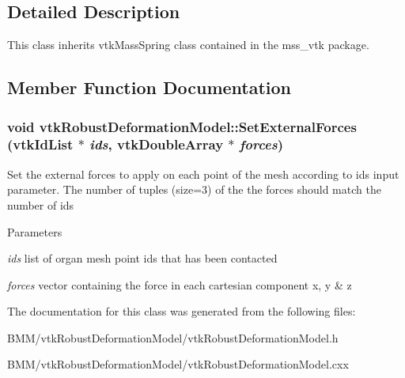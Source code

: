 \subsection{Detailed Description}
This class inherits vtkMassSpring class contained in the mss\_\-vtk package. 

\subsection{Member Function Documentation}
\hypertarget{classvtkRobustDeformationModel_aaa1d4245a3bcc536f145e2686f6135f6}{
\subsubsection[{SetExternalForces}]{\setlength{\rightskip}{0pt plus 5cm}void vtkRobustDeformationModel::SetExternalForces (vtkIdList $\ast$ {\em ids}, \/  vtkDoubleArray $\ast$ {\em forces})}}
\label{classvtkRobustDeformationModel_aaa1d4245a3bcc536f145e2686f6135f6}


Set the external forces to apply on each point of the mesh according to ids input parameter. The number of tuples (size=3) of the the forces should match the number of ids 
\begin{DoxyParams}{Parameters}
\item[{\em ids}]list of organ mesh point ids that has been contacted \item[{\em forces}]vector containing the force in each cartesian component x, y \& z \end{DoxyParams}


The documentation for this class was generated from the following files:\begin{DoxyCompactItemize}
\item 
BMM/vtkRobustDeformationModel/vtkRobustDeformationModel.h\item 
BMM/vtkRobustDeformationModel/vtkRobustDeformationModel.cxx\end{DoxyCompactItemize}
